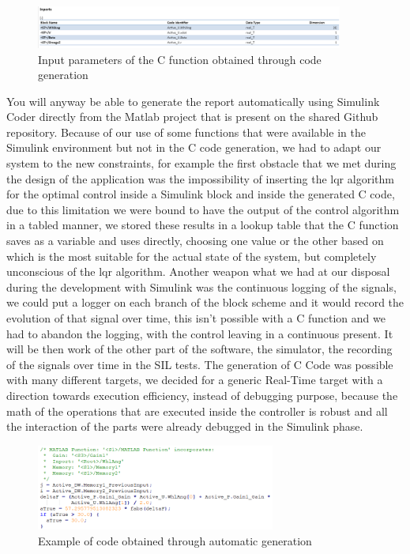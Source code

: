 \begin{figure} \label{Codegen Inports}
		\centering
		\includegraphics[width=0.9\textwidth]{Images/Simulator/codegen-inports}
		\caption{Input parameters of the C function obtained through code generation}	
\end{figure}
You will anyway be able to generate the report automatically using Simulink Coder directly from the Matlab project that is present on the shared Github repository. Because of our use of some functions that were available in the Simulink environment but not in the C code generation, we had to adapt our system to the new constraints, for example the first obstacle that we met during the design of the application was the impossibility of inserting the lqr algorithm for the optimal control inside a Simulink block and inside the generated C code, due to this limitation we were bound to have the output of the control algorithm in a tabled manner, we stored these results in a lookup table that the C function saves as a variable and uses directly, choosing one value or the other based on which is the most suitable for the actual state of the system, but completely unconscious of the lqr algorithm. Another weapon what we had at our disposal during the development with Simulink was the continuous logging of the signals, we could put a logger on each branch of the block scheme and it would record the evolution of that signal over time, this isn't possible with a C function and we had to abandon the logging, with the control leaving in a continuous present. It will be then work of the other part of the software, the simulator, the recording of the signals over time in the SIL tests. The generation of C Code was possible with many different targets, we decided for  a generic Real-Time target with a direction towards execution efficiency, instead of debugging purpose, because the math of the operations that are executed inside the controller is robust and all the interaction of the parts were already debugged in the Simulink phase.
\begin{figure} \label{Codegen Snippet}
		\centering
		\includegraphics[width=0.7\textwidth]{Images/Simulator/codegen-snippet}
		\caption{Example of code obtained through automatic generation}	
\end{figure}

